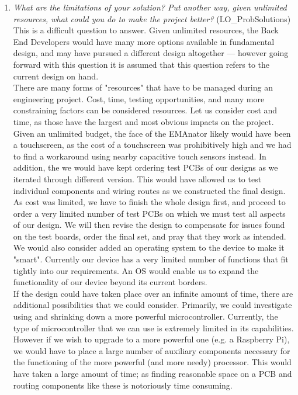 \documentclass[12pt, titlepage]{article}
\begin{document}
\begin{enumerate}
  \item \textit{What are the limitations of your solution?  Put another way, given
  unlimited resources, what could you do to make the project better? }(LO\_ProbSolutions)\\

This is a difficult question to answer. Given unlimited resources, the Back End Developers would have many more options available in fundamental design, and may have pursued a different design altogether --- however going forward with this question it is assumed that this question refers to the current design on hand.\\

There are many forms of "resources" that have to be managed during an engineering project. Cost, time, testing opportunities, and many more constraining factors can be considered resources. Let us consider cost and time, as those have the largest and most obvious impacts on the project.\\

Given an unlimited budget, the face of the EMAnator likely would have been a touchscreen, as the cost of a touchscreen was prohibitively high and we had to find a workaround using nearby capacitive touch sensors instead. In addition, the we would have kept ordering test PCBs of our designs as we iterated through different version. This would have allowed us to test individual components and wiring routes as we constructed the final design. As cost was limited, we have to finish the whole design first, and proceed to order a very limited number of test PCBs on which we must test all aspects of our design. We will then revise the design to compensate for issues found on the test boards, order the final set, and pray that they work as intended. We would also consider added an operating system to the device to make it "smart". Currently our device has a very limited number of functions that fit tightly into our requirements. An OS would enable us to expand the functionality of our device beyond its current borders.\\

If the design could have taken place over an infinite amount of time, there are additional possibilities that we could consider. Primarily, we could investigate using and shrinking down a more powerful microcontroller. Currently, the type of microcontroller that we can use is extremely limited in its capabilities. However if we wish to upgrade to a more powerful one (e.g. a Raspberry Pi), we would have to place a large number of auxiliary components necessary for the functioning of the more powerful (and more needy) processor. This would have taken a large amount of time; as finding reasonable space on a PCB and routing components like these is notoriously time consuming.\\


\end{enumerate}
\end{document}
